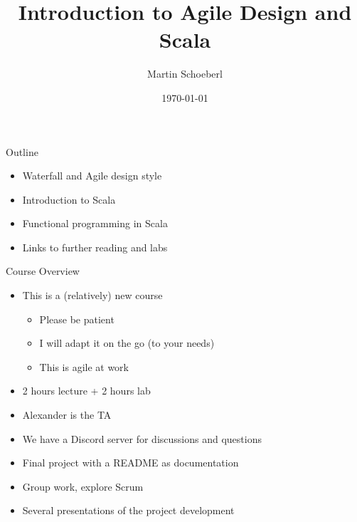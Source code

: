 

\newif\ifbook


\usepackage{tikz}
\usetikzlibrary{positioning, arrows.meta}


\title{Introduction to Agile Design and Scala}
\author{Martin Schoeberl}
\date{\today}



\begin{frame}
\titlepage
\end{frame}




\begin{frame}[fragile]{Outline}
\begin{itemize}
\item Waterfall and Agile design style
\item Introduction to Scala
\item Functional programming in Scala
\item Links to further reading and labs
\end{itemize}
\end{frame}

\begin{frame}[fragile]{Course Overview}
\begin{itemize}
\item This is a (relatively) new course
\begin{itemize}
\item Please be patient
\item I will adapt it on the go (to your needs)
\item This is agile at work
\end{itemize}
\item 2 hours lecture + 2 hours lab
\item Alexander is the TA
\item We have a Discord server for discussions and questions
\item Final project with a README as documentation
\item Group work, explore Scrum
\item Several presentations of the project development
\end{itemize}
\end{frame}

